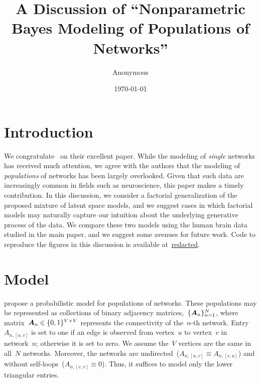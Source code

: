 



\title{A Discussion of ``Nonparametric Bayes Modeling of Populations of Networks''}
\author{
  Anonymous
}
\date{\today}


\maketitle

\doublespacing


\section{Introduction}

We congratulate~\citet{durante2016nonparametric} on their excellent paper.  While the
modeling of \emph{single} networks has received much attention, we agree
with the authors that the modeling of \emph{populations} of
networks has been largely overlooked.  Given that such data are
increasingly common in fields such as neuroscience, this paper makes a
timely contribution.  In this discussion, we consider a factorial
generalization of the proposed mixture of latent space models,
and we suggest cases in which factorial
models may naturally capture our intuition about the
underlying generative process of the data. We compare these two models using the
human brain data studied in the main paper, and we suggest some
avenues for future work.  Code to reproduce the figures in this
discussion is available
at~\url{redacted}.

\section{Model}
\citet{durante2016nonparametric}
propose a probabilistic model for populations of networks. These populations
may be represented as collections of binary adjacency matrices,~$\{\boldsymbol{A}_n\}_{n=1}^N$,
where matrix~${\boldsymbol{A}_n \in \{0,1\}^{V \times V}}$ represents the
connectivity of the~$n$-th network.  Entry~${A_{n,[u,v]}}$ is set to
one if an edge is observed from vertex~$u$ to vertex~$v$ in
network~$n$; otherwise it is set to zero.  We assume the~$V$ vertices
are the same in all~$N$ networks.  Moreover, the networks are
undirected~(${A_{n,[u,v]} \equiv A_{n,[v,u]}}$) and without
self-loops~(${A_{n,[v,v]} \equiv 0}$). Thus, it suffices to model only
the lower triangular entries.

